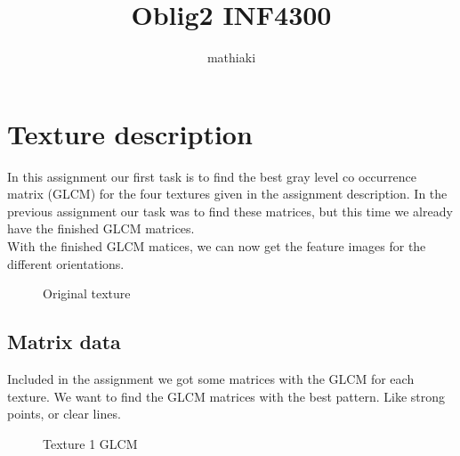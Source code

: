 \documentclass{article}
\title{Oblig2 INF4300}
\author{mathiaki}
\begin{document}
\maketitle

\newpage
\tableofcontents
\newpage

\section{Texture description}
In this assignment our first task is to find the best gray level co
occurrence matrix (GLCM) for the four textures given in the assignment description.
In the previous assignment our task was to find these matrices, but this time we already have the finished GLCM matrices.\\
	
	With the finished GLCM matices, we can now get the feature images for the different orientations.\\
	\begin{figure}[h]%
		\centering
    	\caption{Original texture}%
    	\label{fig:original_texture}%
	\end{figure}	
\newpage
\subsection{Matrix data}
	Included in the assignment we got some matrices with the GLCM for each texture.
	We want to find the GLCM matrices with the best pattern. Like strong points, or clear lines.\\
	\begin{figure}[h!]%
		\centering
    	\caption{Texture 1 GLCM}%
    	\label{fig:o1_f1}%
	\end{figure}
\end{document}
